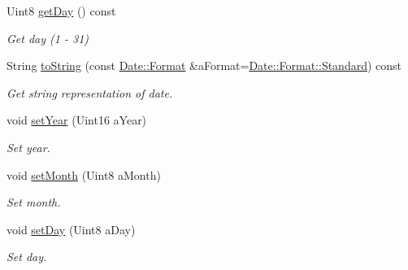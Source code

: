 \begin{DoxyCompactItemize}
Uint8 \hyperlink{classlibrary_1_1physics_1_1time_1_1_date_aa8aac935c5779f912073227a0b6c612f}{get\+Day} () const
\begin{DoxyCompactList}\small\item\em Get day (1 -\/ 31) \end{DoxyCompactList}\item 
String \hyperlink{classlibrary_1_1physics_1_1time_1_1_date_ada28f8fbb98d3684ac2a8030c8cc585a}{to\+String} (const \hyperlink{classlibrary_1_1physics_1_1time_1_1_date_a97671e22ec7b7825cf99ead6d86d0bf7}{Date\+::\+Format} \&a\+Format=\hyperlink{classlibrary_1_1physics_1_1time_1_1_date_a97671e22ec7b7825cf99ead6d86d0bf7aeb6d8ae6f20283755b339c0dc273988b}{Date\+::\+Format\+::\+Standard}) const
\begin{DoxyCompactList}\small\item\em Get string representation of date. \end{DoxyCompactList}\item 
void \hyperlink{classlibrary_1_1physics_1_1time_1_1_date_acf4fd9f68329b5ba94c0a2cc47b9ba49}{set\+Year} (Uint16 a\+Year)
\begin{DoxyCompactList}\small\item\em Set year. \end{DoxyCompactList}\item 
void \hyperlink{classlibrary_1_1physics_1_1time_1_1_date_ad08160a3ab7506616c819bde202022d0}{set\+Month} (Uint8 a\+Month)
\begin{DoxyCompactList}\small\item\em Set month. \end{DoxyCompactList}\item 
void \hyperlink{classlibrary_1_1physics_1_1time_1_1_date_aa13a4824a3d2ba3b40edfa4b8efcf14e}{set\+Day} (Uint8 a\+Day)
\begin{DoxyCompactList}\small\item\em Set day. \end{DoxyCompactList}\end{DoxyCompactItemize}
